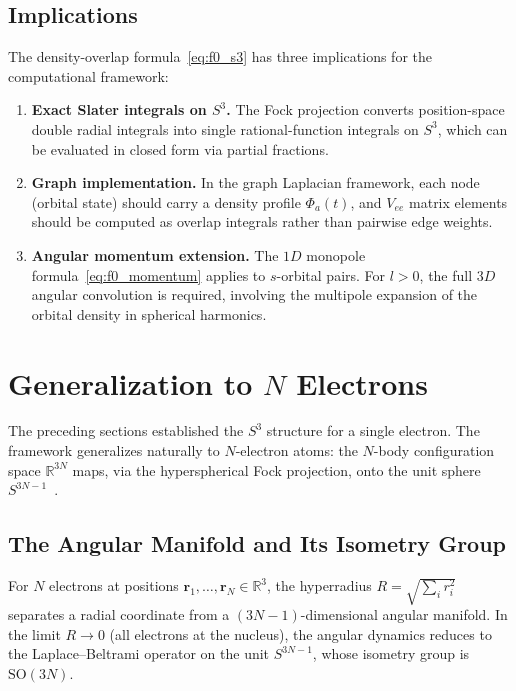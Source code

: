\documentclass[aps,pra,twocolumn,superscriptaddress,longbibliography]{revtex4-2}
\begin{document}
\subsection{Implications}
\label{sec:vee_implications}

The density-overlap formula~\eqref{eq:f0_s3} has three implications
for the computational framework:

\begin{enumerate}
  \item \textbf{Exact Slater integrals on $S^3$.}
    The Fock projection converts position-space double radial integrals
    into single rational-function integrals on $S^3$, which can be
    evaluated in closed form via partial fractions.

  \item \textbf{Graph implementation.}
    In the graph Laplacian framework, each node (orbital state) should
    carry a density profile $\Phi_a(t)$, and $V_{ee}$ matrix elements
    should be computed as overlap integrals rather than pairwise edge
    weights.

  \item \textbf{Angular momentum extension.}
    The $1D$ monopole formula~\eqref{eq:f0_momentum} applies to
    $s$-orbital pairs. For $l > 0$, the full $3D$ angular convolution
    is required, involving the multipole expansion of the orbital
    density in spherical harmonics.
\end{enumerate}


\section{Generalization to $N$ Electrons}
\label{sec:N_electron}

The preceding sections established the $S^3$ structure for a single
electron.  The framework generalizes naturally to $N$-electron atoms:
the $N$-body configuration space $\mathbb{R}^{3N}$ maps, via the
hyperspherical Fock projection, onto the unit sphere
$S^{3N-1}$~\cite{loutey_paper13}.

\subsection{The Angular Manifold and Its Isometry Group}

For $N$ electrons at positions $\bm{r}_1, \ldots, \bm{r}_N \in
\mathbb{R}^3$, the hyperradius $R = \sqrt{\sum_i r_i^2}$ separates
a radial coordinate from a $(3N-1)$-dimensional angular manifold.
In the limit $R \to 0$ (all electrons at the nucleus), the angular
dynamics reduces to the Laplace--Beltrami operator on the unit
$S^{3N-1}$, whose isometry group is $\mathrm{SO}(3N)$.
\end{document}
